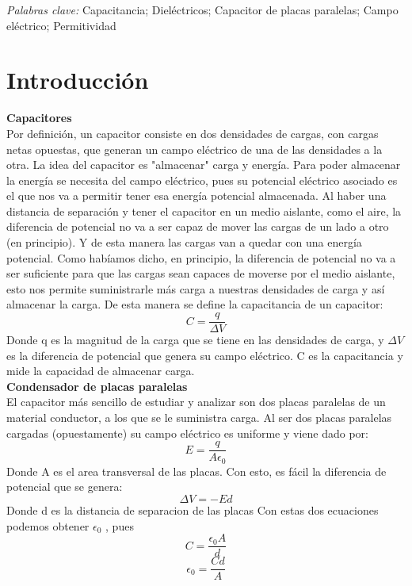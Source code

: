 \documentclass[article,12pt]{elsarticle}
\begin{document}
\noindent \textit{Palabras clave:}  Capacitancia; Dieléctricos; Capacitor de placas paralelas; Campo eléctrico; Permitividad

\section{Introducción}
    \textbf{Capacitores} \\
    Por definición, un capacitor consiste en dos densidades de cargas, con cargas netas opuestas, que generan un campo eléctrico de una de las densidades a la otra. La idea del capacitor es "almacenar" carga y energía. Para poder almacenar la energía se necesita del campo eléctrico, pues su potencial eléctrico asociado es el que nos va a permitir tener esa energía potencial almacenada. Al haber una distancia de separación y tener el capacitor en un medio aislante, como el aire, la diferencia de potencial no va a ser capaz de mover las cargas de un lado a otro (en principio). Y de esta manera las cargas van a quedar con una energía potencial. Como habíamos dicho, en principio, la diferencia de potencial no va a ser suficiente para que las cargas sean capaces de moverse por el medio aislante, esto nos permite suministrarle más carga a nuestras densidades de carga y así almacenar la carga. De esta manera se define la capacitancia de un capacitor:
    \begin{equation}
        C=\frac{q}{\Delta V}
    \end{equation}
    Donde q es la magnitud de la carga que se tiene en las densidades de carga, y $\Delta V$ es la diferencia de potencial que genera su campo eléctrico. C es la capacitancia y mide la capacidad de almacenar carga.\\

    \textbf{Condensador de placas paralelas}\\
    El capacitor más sencillo de estudiar y analizar son dos placas paralelas de un material conductor, a los que se le suministra carga.
    Al ser dos placas paralelas cargadas (opuestamente) su campo eléctrico es uniforme y viene dado por:
    \begin{equation}
        E = \frac{q}{A \epsilon_0}
    \end{equation}
    Donde A es el area transversal de las placas.
    Con esto, es fácil la diferencia de potencial que se genera:
    \begin{equation}
        \Delta V = -Ed
    \end{equation}
    Donde d es la distancia de separacion de las placas
    Con estas dos ecuaciones podemos obtener $\epsilon_0$ , pues
    \begin{equation*}
        C = \frac{\epsilon_0 A}{d} 
    \end{equation*}
    \begin{equation}
        \epsilon_0 = \frac{Cd}{A}
    \end{equation}\\
    
\end{document}
